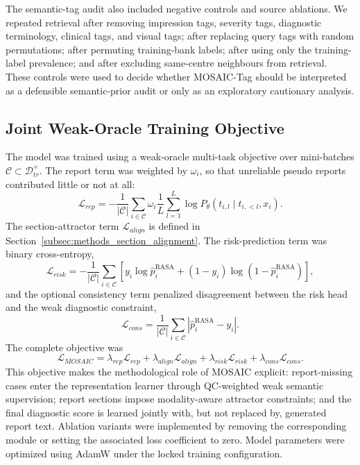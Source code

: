 \documentclass[11pt, a4paper]{article}
\theoremstyle{plain}
\theoremstyle{definition}
\begin{document}
The semantic-tag audit also included negative controls and source ablations. We repeated retrieval after removing impression tags, severity tags, diagnostic terminology, clinical tags, and visual tags; after replacing query tags with random permutations; after permuting training-bank labels; after using only the training-label prevalence; and after excluding same-centre neighbours from retrieval. These controls were used to decide whether MOSAIC-Tag should be interpreted as a defensible semantic-prior audit or only as an exploratory cautionary analysis.

\subsection{Joint Weak-Oracle Training Objective}
\label{subsec:methods_objective}

The model was trained using a weak-oracle multi-task objective over mini-batches \(\mathcal{C}\subset\mathcal{D}_{tr}^{+}\). The report term was weighted by \(\omega_i\), so that unreliable pseudo reports contributed little or not at all:
\begin{equation}
\mathcal{L}_{rep}
=
-\frac{1}{|\mathcal{C}|}
\sum_{i\in\mathcal{C}}
\omega_i
\frac{1}{L}
\sum_{l=1}^{L}
\log P_{\theta}(t_{i,l}\mid t_{i,<l},x_i).
\end{equation}
The section-attractor term \(\mathcal{L}_{align}\) is defined in Section~\ref{subsec:methods_section_alignment}. The risk-prediction term was binary cross-entropy,
\begin{equation}
\mathcal{L}_{risk}
=
-\frac{1}{|\mathcal{C}|}
\sum_{i\in\mathcal{C}}
\left[y_i\log\hat{p}_i^{\mathrm{RASA}}+(1-y_i)\log(1-\hat{p}_i^{\mathrm{RASA}})\right],
\end{equation}
and the optional consistency term penalized disagreement between the risk head and the weak diagnostic constraint,
\begin{equation}
\mathcal{L}_{cons}
=
\frac{1}{|\mathcal{C}|}
\sum_{i\in\mathcal{C}}
|\hat{p}_i^{\mathrm{RASA}}-y_i|.
\end{equation}
The complete objective was
\begin{equation}
\mathcal{L}_{MOSAIC}
=
\lambda_{rep}\mathcal{L}_{rep}
+\lambda_{align}\mathcal{L}_{align}
+\lambda_{risk}\mathcal{L}_{risk}
+\lambda_{cons}\mathcal{L}_{cons}.
\end{equation}
This objective makes the methodological role of MOSAIC explicit: report-missing cases enter the representation learner through QC-weighted weak semantic supervision; report sections impose modality-aware attractor constraints; and the final diagnostic score is learned jointly with, but not replaced by, generated report text. Ablation variants were implemented by removing the corresponding module or setting the associated loss coefficient to zero. Model parameters were optimized using AdamW under the locked training configuration.
\end{document}
